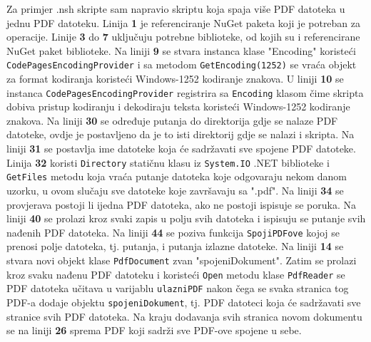 \documentclass{foi}
\begin{document}
Za primjer .nsh skripte sam napravio skriptu koja spaja više PDF datoteka u jednu PDF datoteku. Linija \textbf{1} je referenciranje NuGet paketa koji je potreban za operacije. Linije \textbf{3} do \textbf{7} uključuju potrebne biblioteke, od kojih su i referencirane NuGet paket biblioteke. Na liniji \textbf{9} se stvara instanca klase "Encoding" koristeći \verb|CodePagesEncodingProvider| i sa metodom \verb|GetEncoding(1252)| se vraća objekt za format kodiranja koristeći Windows-1252 kodiranje znakova. U liniji \textbf{10} se instanca \verb|CodePagesEncodingProvider| registrira sa \verb|Encoding| klasom čime skripta dobiva pristup kodiranju i dekodiraju teksta koristeći Windows-1252 kodiranje znakova. Na liniji \textbf{30} se određuje putanja do direktorija gdje se nalaze PDF datoteke, ovdje je postavljeno da je to isti direktorij gdje se nalazi i skripta. Na liniji \textbf{31} se postavlja ime datoteke koja će sadržavati sve spojene PDF datoteke. Linija \textbf{32} koristi \verb|Directory| statičnu klasu iz \verb|System.IO| .NET biblioteke i \verb|GetFiles| metodu koja vraća putanje datoteka koje odgovaraju nekom danom uzorku, u ovom slučaju sve datoteke koje završavaju sa ".pdf". Na liniji \textbf{34} se provjerava postoji li ijedna PDF datoteka, ako ne postoji ispisuje se poruka. Na liniji \textbf{40} se prolazi kroz svaki zapis u polju svih datoteka i ispisuju se putanje svih nađenih PDF datoteka. Na liniji \textbf{44} se poziva funkcija \verb|SpojiPDFove| kojoj se prenosi polje datoteka, tj. putanja, i putanja izlazne datoteke. Na liniji \textbf{14} se stvara novi objekt klase \verb|PdfDocument| zvan "spojeniDokument". Zatim se prolazi kroz svaku nađenu PDF datoteku i koristeći \verb|Open| metodu klase \verb|PdfReader| se PDF datoteka učitava u varijablu \verb|ulazniPDF| nakon čega se svaka stranica tog PDF-a dodaje objektu \verb|spojeniDokument|, tj. PDF datoteci koja će sadržavati sve stranice svih PDF datoteka. Na kraju dodavanja svih stranica novom dokumentu se na liniji \textbf{26} sprema PDF koji sadrži sve PDF-ove spojene u sebe.
\end{document}

